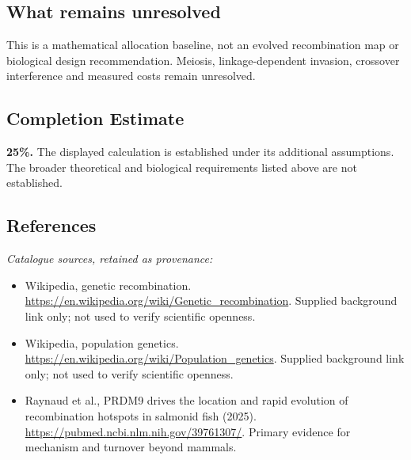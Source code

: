 \documentclass[11pt]{article}
\begin{document}
\subsection{What remains unresolved}
This is a mathematical allocation baseline, not an evolved recombination map or biological design recommendation. Meiosis, linkage-dependent invasion, crossover interference and measured costs remain unresolved.
\subsection{Completion Estimate}
\textbf{25\%.} The displayed calculation is established under its additional assumptions. The broader theoretical and biological requirements listed above are not established.
\subsection{References}
\noindent\emph{Catalogue sources, retained as provenance:}
\begin{itemize}
\item Wikipedia, genetic recombination. \url{https://en.wikipedia.org/wiki/Genetic_recombination}. Supplied background link only; not used to verify scientific openness.
\item Wikipedia, population genetics. \url{https://en.wikipedia.org/wiki/Population_genetics}. Supplied background link only; not used to verify scientific openness.
\item Raynaud et al., PRDM9 drives the location and rapid evolution of recombination hotspots in salmonid fish (2025). \url{https://pubmed.ncbi.nlm.nih.gov/39761307/}. Primary evidence for mechanism and turnover beyond mammals.
\end{itemize}
\end{document}
